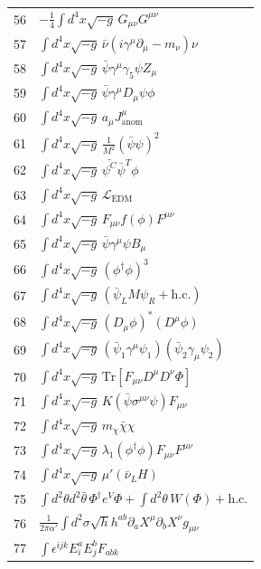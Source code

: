 \documentclass[12pt,a4paper]{article}
\begin{document}
\begin{longtable}{r p{}}
	56 & \(\displaystyle -\frac14\int d^4x\sqrt{-g}\,G_{\mu\nu}G^{\mu\nu}\) \\
	57 & \(\displaystyle \int d^4x\sqrt{-g}\,\bar\nu(i\gamma^\mu\partial_\mu - m_\nu)\nu\) \\
	58 & \(\displaystyle \int d^4x\sqrt{-g}\,\bar\psi\gamma^\mu\gamma_5\psi Z_\mu\) \\
	59 & \(\displaystyle \int d^4x\sqrt{-g}\,\bar\psi\gamma^\mu D_\mu\psi\phi\) \\
	60 & \(\displaystyle \int d^4x\sqrt{-g}\,a_\mu J^\mu_{\text{anom}}\) \\
	61 & \(\displaystyle \int d^4x\sqrt{-g}\,\frac{1}{M^2}(\bar\psi\psi)^2\) \\
	62 & \(\displaystyle \int d^4x\sqrt{-g}\,\bar{\psi^C}\bar{\psi}^T\phi\) \\
	63 & \(\displaystyle \int d^4x\sqrt{-g}\,\mathcal{L}_{\text{EDM}}\) \\
	64 & \(\displaystyle \int d^4x\sqrt{-g}\,F_{\mu\nu}f(\phi)F^{\mu\nu}\) \\
	65 & \(\displaystyle \int d^4x\sqrt{-g}\,\bar\psi\gamma^\mu\psi B_\mu\) \\
	66 & \(\displaystyle \int d^4x\sqrt{-g}\,(\phi^\dagger\phi)^3\) \\
	67 & \(\displaystyle \int d^4x\sqrt{-g}\,(\bar\psi_L M \psi_R + \text{h.c.})\) \\
	68 & \(\displaystyle \int d^4x\sqrt{-g}\,(D_\mu\phi)^*(D^\mu\phi)\) \\
	69 & \(\displaystyle \int d^4x\sqrt{-g}\,(\bar\psi_1\gamma^\mu\psi_1)(\bar\psi_2\gamma_\mu\psi_2)\) \\
	70 & \(\displaystyle \int d^4x\sqrt{-g}\,\mathrm{Tr}[F_{\mu\nu}D^\mu D^\nu\Phi]\) \\
	71 & \(\displaystyle \int d^4x\sqrt{-g}\,K(\bar\psi\sigma^{\mu\nu}\psi)F_{\mu\nu}\) \\
	72 & \(\displaystyle \int d^4x\sqrt{-g}\,m_\chi\bar\chi\chi\) \\
	73 & \(\displaystyle \int d^4x\sqrt{-g}\,\lambda_1(\phi^\dagger\phi)F_{\mu\nu}F^{\mu\nu}\) \\
	74 & \(\displaystyle \int d^4x\sqrt{-g}\,\mu'(\bar\nu_L H)\) \\
	75 & \(\displaystyle \int d^2\theta d^2\bar\theta\,\Phi^\dagger e^V\Phi + \int d^2\theta\,W(\Phi) + \text{h.c.}\) \\
	76 & \(\displaystyle \frac{1}{2\pi\alpha'}\int d^2\sigma\sqrt{h}h^{ab}\partial_a X^\mu\partial_b X^\nu g_{\mu\nu}\) \\
	77 & \(\displaystyle \int \epsilon^{ijk}E_i^a E_j^b F_{ab k}\) \\

\end{longtable}
\end{document}
